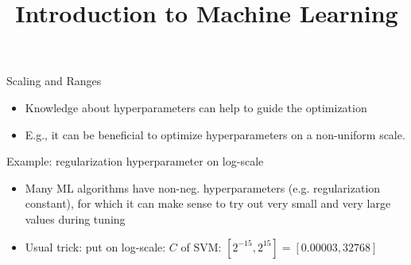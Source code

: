 \documentclass[11pt,compress,t,notes=noshow, xcolor=table]{beamer}
\title{Introduction to Machine Learning}
\institute{\href{https://compstat-lmu.github.io/lecture_i2ml/}{compstat-lmu.github.io/lecture\_i2ml}}
\date{}
\begin{document}








\sloppy

\begin{frame}[allowframebreaks]{Scaling and Ranges}

\begin{itemize}
	\item Knowledge about hyperparameters can help to guide the optimization
	\item E.g., it can be beneficial to optimize hyperparameters on a non-uniform scale.
\end{itemize}

Example: regularization hyperparameter on log-scale

\begin{itemize}
    \item Many ML algorithms have non-neg. hyperparameters (e.g. regularization constant), for which it can make sense to try out very small and very large values during tuning 
    \item Usual trick: put on log-scale: $C$ of SVM: $[2^{-15}, 2^{15}] = [0.00003, 32768]$
\end{itemize}


\end{frame}
\end{document}
